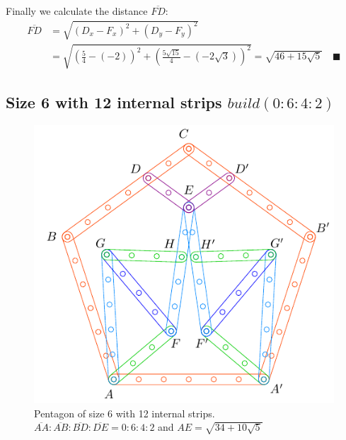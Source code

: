 \documentclass[11pt]{article}
\begin{document}
Finally we calculate the distance $\overline{FD}$:
\begin{align}
\overline{FD} &= \sqrt{(D_x - F_x)^2 + (D_y - F_y)^2} \nonumber\\
 &= \sqrt{ \left( \frac{5}4 -(-2) \right)^2 
  + \left( \frac{5\sqrt{15}}4 -(-2\sqrt{3}) \right)^2}
 = \sqrt{46 + 15\sqrt{5}} \quad \blacksquare
\end{align}


\subsection{Size 6 with 12 internal strips $build(0:6:4:2)$}

\begin{figure}[H]
\centering
\includegraphics[scale=1]{6/penta6-12a}
\caption{Pentagon of size 6 with 12 internal strips. $\overline{AA}:\overline{AB}:\overline{BD}:\overline{DE} = 0:6:4:2$ and $AE = \sqrt{34 + 10\sqrt5}$} 
\label{fig:penta6-12a}
\end{figure}
\end{document}
